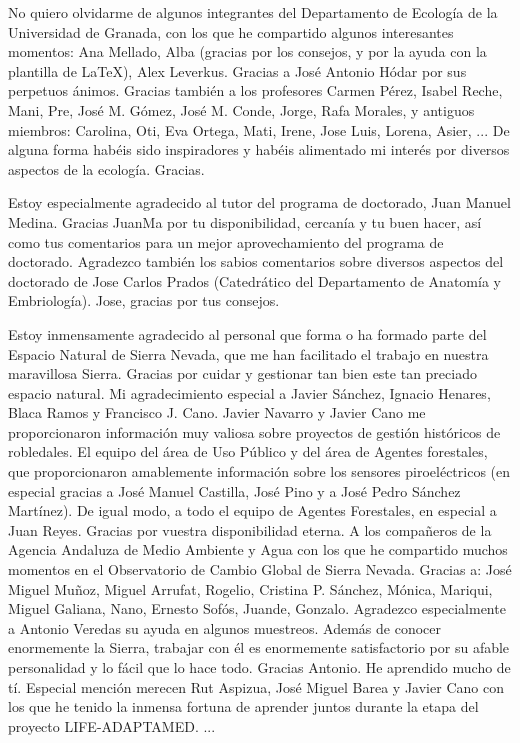 No quiero olvidarme de algunos integrantes del Departamento de Ecología de la Universidad de Granada, con los que he compartido algunos interesantes momentos: Ana Mellado, Alba (gracias por los consejos, y por la ayuda con la plantilla de \LaTeX{}), Alex Leverkus. Gracias a José Antonio Hódar por sus perpetuos ánimos. Gracias también a los profesores Carmen Pérez, Isabel Reche, Mani, Pre, José M. Gómez, José M. Conde, Jorge, Rafa Morales, y antiguos miembros: Carolina, Oti, Eva Ortega, Mati, Irene, Jose Luis, Lorena, Asier, ... De alguna forma habéis sido inspiradores y habéis alimentado mi interés por diversos aspectos de la ecología. Gracias. 

Estoy especialmente agradecido al tutor del programa de doctorado, Juan Manuel Medina. Gracias JuanMa por tu disponibilidad, cercanía y tu buen hacer, así como tus comentarios para un mejor aprovechamiento del programa de doctorado. Agradezco también los sabios comentarios sobre diversos aspectos del doctorado de Jose Carlos Prados (Catedrático del Departamento de Anatomía y Embriología). Jose, gracias por tus consejos. 

Estoy inmensamente agradecido al personal que forma o ha formado parte del Espacio Natural de Sierra Nevada, que me han facilitado el trabajo en nuestra maravillosa Sierra. Gracias por cuidar y gestionar tan bien este tan preciado espacio natural. Mi agradecimiento especial a Javier Sánchez, Ignacio Henares, Blaca Ramos y Francisco J. Cano. Javier Navarro y Javier Cano me proporcionaron información muy valiosa sobre proyectos de gestión históricos de robledales. El equipo del área de Uso Público y del área de Agentes forestales, que proporcionaron amablemente información sobre los sensores piroeléctricos (en especial gracias a José Manuel Castilla, José Pino y a José Pedro Sánchez Martínez). De igual modo, a todo el equipo de Agentes Forestales, en especial a Juan Reyes. Gracias por vuestra disponibilidad eterna. A los compañeros de la Agencia Andaluza de Medio Ambiente y Agua con los que he compartido muchos momentos en el Observatorio de Cambio Global de Sierra Nevada. Gracias a: José Miguel Muñoz, Miguel Arrufat, Rogelio, Cristina P. Sánchez, Mónica, Mariqui, Miguel Galiana, Nano, Ernesto Sofós, Juande, Gonzalo. Agradezco especialmente a Antonio Veredas su ayuda en algunos muestreos. Además de conocer enormemente la Sierra, trabajar con él es enormemente satisfactorio por su afable personalidad y lo fácil que lo hace todo. Gracias Antonio. He aprendido mucho de tí. Especial mención merecen Rut Aspizua, José Miguel Barea y Javier Cano con los que he tenido la inmensa fortuna de aprender juntos durante la etapa del proyecto LIFE-ADAPTAMED.  
... 

